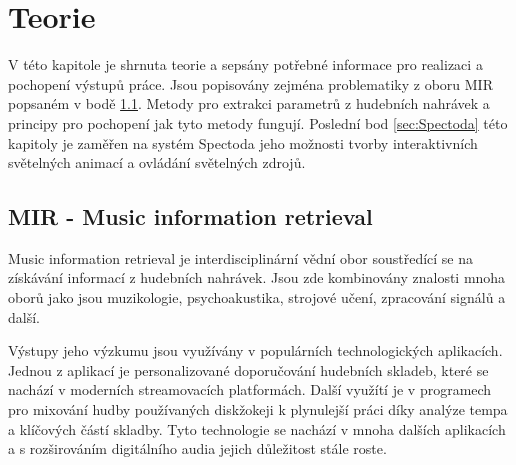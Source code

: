 \chapter{Teorie} \label{sec:Teorie}

V této kapitole je shrnuta teorie a sepsány potřebné informace pro realizaci a pochopení výstupů práce. Jsou popisovány zejména problematiky z oboru \acs{MIR} popsaném v bodě \ref{sec:MIR}. Metody pro extrakci parametrů z hudebních nahrávek a principy pro pochopení jak tyto metody fungují. Poslední bod \ref{sec:Spectoda} této kapitoly je zaměřen na systém Spectoda jeho možnosti tvorby interaktivních světelných animací a ovládání světelných zdrojů. 

\section{MIR - Music information retrieval} \label{sec:MIR}
    Music information retrieval je interdisciplinární vědní obor soustředící se na získávání informací z hudebních nahrávek.
    Jsou zde kombinovány znalosti mnoha oborů jako jsou muzikologie, psychoakustika, strojové učení, zpracování signálů a další. 
    
    Výstupy jeho výzkumu jsou využívány v populárních technologických aplikacích. 
    Jednou z aplikací je personalizované doporučování hudebních skladeb, které se nachází v moderních streamovacích platformách.
    Další využítí je v programech pro mixování hudby používaných diskžokeji k plynulejší práci díky analýze tempa a klíčových částí skladby.
    Tyto technologie se nachází v mnoha dalších aplikacích a s rozširováním digitálního audia jejich důležitost stále roste. %
    
